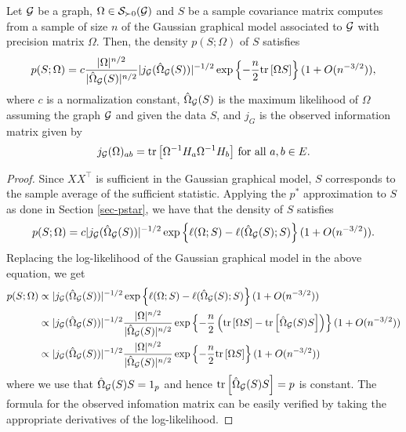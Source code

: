 \begin{lemma} \label{lem-pstar-covariance}
    Let ${\mathcal{G}}$ be a graph, $\Omega \in {\mathcal{S}}_{\succ 0}({\mathcal{G}})$ and $S$ be a sample covariance matrix computes from a sample of size $n$ of the Gaussian graphical model associated to ${\mathcal{G}}$ with precision matrix $\Omega$. Then, the density $p(S; \Omega)$ of $S$ satisfies
    \begin{equation*}
        p(S; \Omega) = c \frac{|\Omega|^{n/2}}{|\hat\Omega_{\mathcal{G}}(S)|^{n/2}} |j_{\mathcal{G}}(\hat\Omega_{\mathcal{G}}(S)) |^{-1/2} \exp\left\{-\frac{n}{2} {\textrm{tr}\left[\Omega S\right]}\right\} (1 + O(n^{-3/2})),
    \end{equation*}
    where $c$ is a normalization constant, $\hat\Omega_{\mathcal{G}}(S)$ is the maximum likelihood of $\Omega$ assuming the graph ${\mathcal{G}}$ and given the data $S$, and $j_G$ is the observed information matrix given by
    \begin{equation} \label{eq-obs-info}
        j_{\mathcal{G}}(\Omega)_{a b} = {\textrm{tr}\left[\Omega^{-1} H_a \Omega^{-1} H_b\right]} {\textrm{ for all }} a, b  \in E.
    \end{equation}
\end{lemma}

\begin{proof}
    Since $XX^\top$ is sufficient in the Gaussian graphical model, $S$ corresponds to the sample average of the sufficient statistic. Applying the $p^*$ approximation to $S$ as done in Section \ref{sec-pstar}, we have that the density of $S$ satisfies
    \begin{equation*}
        p(S; \Omega) = c |j_{\mathcal{G}}(\hat\Omega_{\mathcal{G}}(S))|^{-1/2} \exp\left\{\ell(\Omega; S) - \ell(\hat\Omega_{\mathcal{G}}(S); S)\right\} (1 + O(n^{-3/2})).
    \end{equation*}
    Replacing the log-likelihood of the Gaussian graphical model in the above equation, we get
    \begin{align*}
        p(S; \Omega) 
        &\propto |j_{\mathcal{G}}(\hat\Omega_{\mathcal{G}}(S))|^{-1/2} \exp\left\{\ell(\Omega; S) - \ell(\hat\Omega_{\mathcal{G}}(S); S)\right\} (1 + O(n^{-3/2})) \\
        &\propto |j_{\mathcal{G}}(\hat\Omega_{\mathcal{G}}(S))|^{-1/2} 
        \frac{|\Omega|^{n/2}}{|\hat\Omega_{\mathcal{G}}(S)|^{n/2}}
        \exp\left\{-\frac{n}{2}\left({\textrm{tr}\left[\Omega S\right]} - {\textrm{tr}\left[\hat\Omega_{\mathcal{G}}(S) S\right]}\right)\right\} (1 + O(n^{-3/2}))\\
        &\propto |j_{\mathcal{G}}(\hat\Omega_{\mathcal{G}}(S))|^{-1/2} 
        \frac{|\Omega|^{n/2}}{|\hat\Omega_{\mathcal{G}}(S)|^{n/2}}
        \exp\left\{-\frac{n}{2}{\textrm{tr}\left[\Omega S\right]}\right\} (1 + O(n^{-3/2}))
    \end{align*}
    where we use that $\hat\Omega_{\mathcal{G}}(S) S = 1_p$ and hence ${\textrm{tr}\left[\hat\Omega_{\mathcal{G}}(S) S\right]} = p$ is constant. The formula for the observed infomation matrix can be easily verified by taking the appropriate derivatives of the log-likelihood.
\end{proof}

